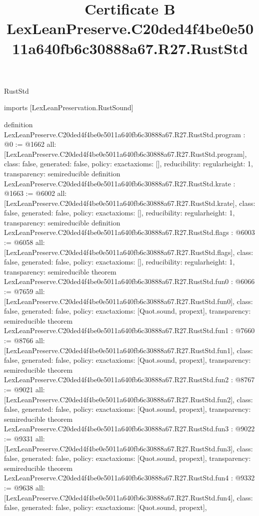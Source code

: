 \begin{lexlean}{RustStd}
\title{Certificate B LexLeanPreserve.C20ded4f4be0e5011a640fb6c30888a67.R27.RustStd}
\begin{coremodule}
imports [LexLeanPreservation.RustSound]

definition LexLeanPreserve.C20ded4f4be0e5011a640fb6c30888a67.R27.RustStd.program : @0 := @1662 {
  all: [LexLeanPreserve.C20ded4f4be0e5011a640fb6c30888a67.R27.RustStd.program],
  class: false,
  generated: false,
  policy: exact{axioms: []},
  reducibility: regular{height: 1},
  transparency: semireducible
}
definition LexLeanPreserve.C20ded4f4be0e5011a640fb6c30888a67.R27.RustStd.krate : @1663 := @6002 {
  all: [LexLeanPreserve.C20ded4f4be0e5011a640fb6c30888a67.R27.RustStd.krate],
  class: false,
  generated: false,
  policy: exact{axioms: []},
  reducibility: regular{height: 1},
  transparency: semireducible
}
definition LexLeanPreserve.C20ded4f4be0e5011a640fb6c30888a67.R27.RustStd.flags : @6003 := @6058 {
  all: [LexLeanPreserve.C20ded4f4be0e5011a640fb6c30888a67.R27.RustStd.flags],
  class: false,
  generated: false,
  policy: exact{axioms: []},
  reducibility: regular{height: 1},
  transparency: semireducible
}
theorem LexLeanPreserve.C20ded4f4be0e5011a640fb6c30888a67.R27.RustStd.fun0 : @6066 := @7659 {
  all: [LexLeanPreserve.C20ded4f4be0e5011a640fb6c30888a67.R27.RustStd.fun0],
  class: false,
  generated: false,
  policy: exact{axioms: [Quot.sound, propext]},
  transparency: semireducible
}
theorem LexLeanPreserve.C20ded4f4be0e5011a640fb6c30888a67.R27.RustStd.fun1 : @7660 := @8766 {
  all: [LexLeanPreserve.C20ded4f4be0e5011a640fb6c30888a67.R27.RustStd.fun1],
  class: false,
  generated: false,
  policy: exact{axioms: [Quot.sound, propext]},
  transparency: semireducible
}
theorem LexLeanPreserve.C20ded4f4be0e5011a640fb6c30888a67.R27.RustStd.fun2 : @8767 := @9021 {
  all: [LexLeanPreserve.C20ded4f4be0e5011a640fb6c30888a67.R27.RustStd.fun2],
  class: false,
  generated: false,
  policy: exact{axioms: [Quot.sound, propext]},
  transparency: semireducible
}
theorem LexLeanPreserve.C20ded4f4be0e5011a640fb6c30888a67.R27.RustStd.fun3 : @9022 := @9331 {
  all: [LexLeanPreserve.C20ded4f4be0e5011a640fb6c30888a67.R27.RustStd.fun3],
  class: false,
  generated: false,
  policy: exact{axioms: [Quot.sound, propext]},
  transparency: semireducible
}
theorem LexLeanPreserve.C20ded4f4be0e5011a640fb6c30888a67.R27.RustStd.fun4 : @9332 := @9638 {
  all: [LexLeanPreserve.C20ded4f4be0e5011a640fb6c30888a67.R27.RustStd.fun4],
  class: false,
  generated: false,
  policy: exact{axioms: [Quot.sound, propext]},
}
\end{coremodule}
\end{lexlean}
